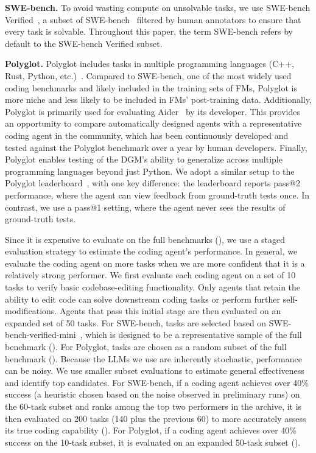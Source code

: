 \documentclass{article}
\begin{document}
\textbf{SWE-bench.} To avoid wasting compute on unsolvable tasks, we use SWE-bench Verified~\citep{openai2024sweverified}, a subset of SWE-bench~\citep{jimenez2024swebench} filtered by human annotators to ensure that every task is solvable. Throughout this paper, the term SWE-bench refers by default to the SWE-bench Verified subset.

\textbf{Polyglot.} Polyglot includes tasks in multiple programming languages (C++, Rust, Python, etc.)~\citep{gauthier2024polyglot}. Compared to SWE-bench, one of the most widely used coding benchmarks and likely included in the training sets of FMs, Polyglot is more niche and less likely to be included in FMs' post-training data. Additionally, Polyglot is primarily used for evaluating Aider~\citep{aider2024} by its developer. This provides an opportunity to compare automatically designed agents with a representative coding agent in the community, which has been continuously developed and tested against the Polyglot benchmark over a year by human developers. Finally, Polyglot enables testing of the DGM's ability to generalize across multiple programming languages beyond just Python. We adopt a similar setup to the Polyglot leaderboard~\citep{gauthier2024polyglot}, with one key difference: the leaderboard reports pass@2 performance, where the agent can view feedback from ground-truth tests once. In contrast, we use a pass@1 setting, where the agent never sees the results of ground-truth tests.

Since it is expensive to evaluate on the full benchmarks (), we use a staged evaluation strategy to estimate the coding agent's performance. In general, we evaluate the coding agent on more tasks when we are more confident that it is a relatively strong performer. We first evaluate each coding agent on a set of 10 tasks to verify basic codebase-editing functionality. Only agents that retain the ability to edit code can solve downstream coding tasks or perform further self-modifications. Agents that pass this initial stage are then evaluated on an expanded set of 50 tasks. For SWE-bench, tasks are selected based on SWE-bench-verified-mini~\citep{hobbhahn2025swebenchmini}, which is designed to be a representative sample of the full benchmark (). For Polyglot, tasks are chosen as a random subset of the full benchmark (). Because the LLMs we use are inherently stochastic, performance can be noisy. We use smaller subset evaluations to estimate general effectiveness and identify top candidates. For SWE-bench, if a coding agent achieves over 40\% success (a heuristic chosen based on the noise observed in preliminary runs) on the 60-task subset and ranks among the top two performers in the archive, it is then evaluated on 200 tasks (140 plus the previous 60) to more accurately assess its true coding capability (). For Polyglot, if a coding agent achieves over 40\% success on the 10-task subset, it is evaluated on an expanded 50-task subset ().
\end{document}
